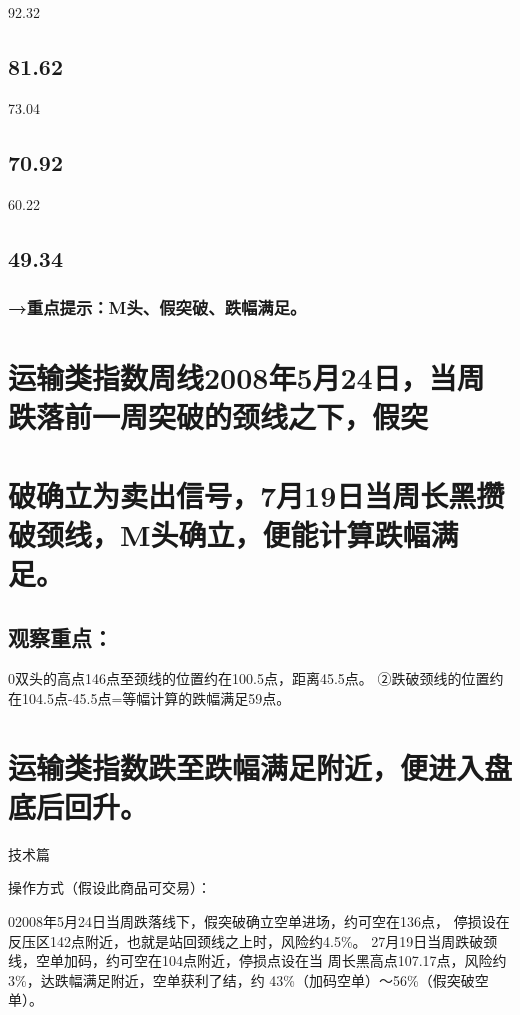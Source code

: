 \documentclass{article}
\begin{document}
92.32

\subsection{81.62}

73.04

\subsection{70.92}

60.22

\subsection{49.34}

\subsubsection{→重点提示：M头、假突破、跌幅满足。}

\section{运输类指数周线2008年5月24日，当周跌落前一周突破的颈线之下，假突}

\section{破确立为卖出信号，7月19日当周长黑攒破颈线，M头确立，便能计算跌幅满 足。}

\subsection{观察重点：}

0双头的高点146点至颈线的位置约在100.5点，距离45.5点。 ②跌破颈线的位置约在104.5点-45.5点=等幅计算的跌幅满足59点。

\section{运输类指数跌至跌幅满足附近，便进入盘底后回升。}

\clearpage

技术篇

操作方式（假设此商品可交易）：

02008年5月24日当周跌落线下，假突破确立空单进场，约可空在136点， 停损设在反压区142点附近，也就是站回颈线之上时，风险约4.5\%。 27月19日当周跌破颈线，空单加码，约可空在104点附近，停损点设在当 周长黑高点107.17点，风险约3\%，达跌幅满足附近，空单获利了结，约 43\%（加码空单）～56\%（假突破空单）。
\end{document}
